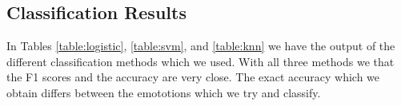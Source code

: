 \subsection{Classification Results}

In Tables \ref{table:logistic}, \ref{table:svm}, and \ref{table:knn}
we have the output of the different classification methods which we used.
With all three methods we that the F1 scores and the accuracy are very close.
The exact accuracy which we obtain differs between the emototions which we try and classify.
